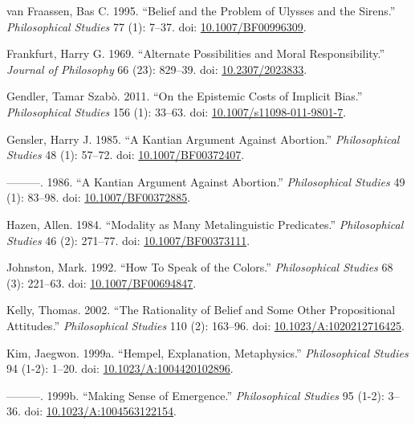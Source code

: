 \documentclass[
  11pt,
  letterpaper,
  DIV=11,
  numbers=noendperiod,
  twoside]{scrartcl}
\newlength{\cslhangindent}
\newenvironment{CSLReferences}[2] %
 {\begin{list}{}{%
  \setlength{\itemindent}{0pt}
  \setlength{\leftmargin}{0pt}
  \setlength{\parsep}{0pt}
  \ifodd #1
   \setlength{\leftmargin}{\cslhangindent}
   \setlength{\itemindent}{-1\cslhangindent}
  \fi
  \setlength{\itemsep}{#2\baselineskip}}}
 {\end{list}}
\begin{document}
\begin{CSLReferences}{1}{0}
van Fraassen, Bas C. 1995. {``Belief and the Problem of Ulysses and the
Sirens.''} \emph{Philosophical Studies} 77 (1): 7--37. doi:
\href{https://doi.org/10.1007/BF00996309}{10.1007/BF00996309}.

Frankfurt, Harry G. 1969. {``Alternate Possibilities and Moral
Responsibility.''} \emph{Journal of Philosophy} 66 (23): 829--39. doi:
\href{https://doi.org/10.2307/2023833}{10.2307/2023833}.

Gendler, Tamar Szabò. 2011. {``On the Epistemic Costs of Implicit
Bias.''} \emph{Philosophical Studies} 156 (1): 33--63. doi:
\href{https://doi.org/10.1007/s11098-011-9801-7}{10.1007/s11098-011-9801-7}.

Gensler, Harry J. 1985. {``A Kantian Argument Against Abortion.''}
\emph{Philosophical Studies} 48 (1): 57--72. doi:
\href{https://doi.org/10.1007/BF00372407}{10.1007/BF00372407}.

---------. 1986. {``A Kantian Argument Against Abortion.''}
\emph{Philosophical Studies} 49 (1): 83--98. doi:
\href{https://doi.org/10.1007/BF00372885}{10.1007/BF00372885}.

Hazen, Allen. 1984. {``Modality as Many Metalinguistic Predicates.''}
\emph{Philosophical Studies} 46 (2): 271--77. doi:
\href{https://doi.org/10.1007/BF00373111}{10.1007/BF00373111}.

Johnston, Mark. 1992. {``How To Speak of the Colors.''}
\emph{Philosophical Studies} 68 (3): 221--63. doi:
\href{https://doi.org/10.1007/BF00694847}{10.1007/BF00694847}.

Kelly, Thomas. 2002. {``The Rationality of Belief and Some Other
Propositional Attitudes.''} \emph{Philosophical Studies} 110 (2):
163--96. doi:
\href{https://doi.org/10.1023/A:1020212716425}{10.1023/A:1020212716425}.

Kim, Jaegwon. 1999a. {``Hempel, Explanation, Metaphysics.''}
\emph{Philosophical Studies} 94 (1-2): 1--20. doi:
\href{https://doi.org/10.1023/A:1004420102896}{10.1023/A:1004420102896}.

---------. 1999b. {``Making Sense of Emergence.''} \emph{Philosophical
Studies} 95 (1-2): 3--36. doi:
\href{https://doi.org/10.1023/A:1004563122154}{10.1023/A:1004563122154}.


\end{CSLReferences}
\end{document}
